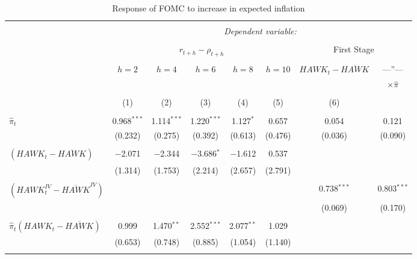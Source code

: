 \documentclass[12pt]{article}
\numberwithin{equation}{section}
\begin{document}
\begin{table}[!htbp] \centering \scriptsize
    \begin{threeparttable}
    \caption{Response of FOMC to increase in expected inflation} 
    \label{tab:fullcoef} 
  \begin{tabular}{@{\extracolsep{2pt}}lccccccc} 
  \\[-1.8ex]\hline 
  \hline \\[-1.8ex] 
   & \multicolumn{7}{c}{\textit{Dependent variable:}} \\ 
  \cline{2-7} 
  \\[-1.8ex]  & \multicolumn{5}{c}{$r_{t+h}-\rho_{t+h}$}&\multicolumn{2}{c}{First Stage}\\ 
  \\[-1.8ex] & $h=2$&$h=4$ & $h=6$ & $h=8$& $h=10$ &  $\mathit{HAWK}_t-\overline{\mathit{HAWK}}$& ---''--- \\ &&&&&&& $\times\hat\pi$ \\
  \\[-1.8ex] & (1) & (2) & (3) & (4) & (5) & (6)\\ 
  \hline \\[-1.8ex] 
   $\hat\pi_t$ & 0.968$^{***}$ & 1.114$^{***}$ & 1.220$^{***}$ & 1.127$^{*}$ & 0.657 & 0.054 & 0.121 \\ 
   & (0.232) & (0.275) & (0.392) & (0.613) & (0.476) & (0.036) & (0.090) \\ 
    & & & & & & \\ 
    $\left(\mathit{HAWK}_t-\overline{\mathit{HAWK}}\right)$ & $-$2.071 & $-$2.344 & $-$3.686$^{*}$ & $-$1.612 & 0.537 &  &  \\ 
    & (1.314) & (1.753) & (2.214) & (2.657) & (2.791) &  &  \\ 
    & & & & & & \\ 
    $\left(\mathit{HAWK}_t^\mathit{IV}-\overline{\mathit{HAWK}}^\mathit{IV}\right)$ &  &  &  &  &  & 0.738$^{***}$ & 0.803$^{***}$ \\ 
    &  &  &  &  &  & (0.069) & (0.170) \\ 
    & & & & & & & \\ 
    $\hat\pi_t (\mathit{HAWK}_{t}-\overline{\mathit{HAWK}})$ & 0.999 & 1.470$^{**}$ & 2.552$^{***}$ & 2.077$^{**}$ & 1.029 &  &  \\ 
    & (0.653) & (0.748) & (0.885) & (1.054) & (1.140) &  &  \\ 
    & & & & & & \\ 


\end{tabular}
\end{threeparttable}
\end{table}
\end{document}
